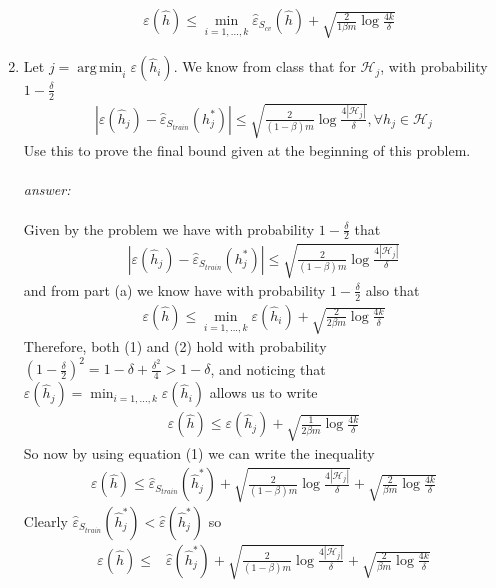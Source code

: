 \documentclass{article}
\DeclareMathOperator*{\argmin}{arg\,min}
\begin{document}
\begin{enumerate}[label=(\alph*)]
\begin{align*}
        &\varepsilon(\hat{h})\leq \min_{i=1,...,k}\hat{\varepsilon}_S_{cv}(\hat{h})+ \sqrt{\frac{2}{1\beta m}\log \frac{4k}{\delta}}
    \end{align*}
    \item Let $j = \argmin_i \varepsilon(\hat{h}_i)$. We know from class that for $\mathcal{H}_j$, with probability $1-\frac{\delta}{2}$
    \begin{align*}
        |\varepsilon(\hat{h}_j)-\hat{\varepsilon}_{S_{train}}(h_j^*)|\leq\sqrt{\frac{2}{(1-\beta)m}\log\frac{4|\mathcal{H}_j|}{\delta}}, \forall h_j \in \mathcal{H}_j
    \end{align*}
    Use this to prove the final bound given at the beginning of this problem.\\\\
    \textit{answer:}\\\\
    Given by the problem we have with probability $1-\frac{\delta}{2}$ that
    \begin{align}
        |\varepsilon(\hat{h}_j)-\hat{\varepsilon}_{S_{train}}(h_j^*)|\leq\sqrt{\frac{2}{(1-\beta)m}\log\frac{4|\mathcal{H}_j|}{\delta}}
    \end{align}
    and from part (a) we know have with probability $1-\frac{\delta}{2}$ also that
    \begin{align}
        \varepsilon(\hat{h})\leq \min_{i=1,...,k}\varepsilon(\hat{h}_i)+ \sqrt{\frac{2}{2\beta m}\log \frac{4k}{\delta}}
    \end{align}
    Therefore, both (1) and (2) hold with probability $(1-\frac{\delta}{2})^2 = 1 - \delta + \frac{\delta^2}{4} > 1-\delta$, and noticing that $\varepsilon(\hat{h}_j) = \min_{i=1,...,k}\varepsilon(\hat{h}_i)$ allows us to write
    \begin{align*}
        \varepsilon(\hat{h})\leq \varepsilon(\hat{h}_j)+ \sqrt{\frac{1}{2\beta m}\log \frac{4k}{\delta}}
    \end{align*}
    So now by using equation (1) we can write the inequality
    \begin{align*}
        \varepsilon(\hat{h})\leq \hat{\varepsilon}_{S_{train}}(\hat{h}_j^*) +  \sqrt{\frac{2}{(1-\beta)m}\log\frac{4|\mathcal{H}_j|}{\delta}}+ \sqrt{\frac{2}{\beta m}\log \frac{4k}{\delta}}
    \end{align*}
    Clearly $\hat{\varepsilon}_{S_{train}}(\hat{h}_j^*) < \hat{\varepsilon}(\hat{h}_j^*)$ so
    \begin{align*}
        \varepsilon(\hat{h})\leq&{} \hat{\varepsilon}(\hat{h}_j^*) +  \sqrt{\frac{2}{(1-\beta)m}\log\frac{4|\mathcal{H}_j|}{\delta}}+ \sqrt{\frac{2}{\beta m}\log \frac{4k}{\delta}}\\

\end{align*}
\end{enumerate}
\end{document}
